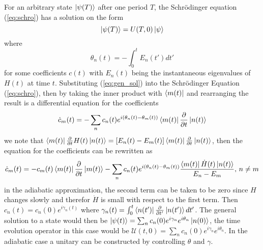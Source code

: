 For an arbitrary state $\ket{\psi(T)}$ after one period $T$, the Schrödinger equation (\ref{eq:schro}) has a solution on the form 
\begin{equation}
\label{eq:gen_sol}
\ket{\psi(T)} = U(T,0)\ket{\psi}
\end{equation}
where 
\begin{equation}
\theta_n(t) = -\int_0^t E_n(t')dt'
\end{equation}
for some coefficients $c(t)$ with $E_n(t)$ being the instantaneous eigenvalues of $H(t)$ at time $t$. Substituting (\ref{eq:gen_sol}) into the Schrödinger Equation (\ref{eq:schro}), then by taking the inner product with $\bra{m(t)}$ and rearranging the result is a differential equation for the coefficients 
\begin{equation}
\dot{c}_m(t) = -\sum_{n}c_n(t) e^{i(\theta_n(t) - \theta_m(t))}\bra{m(t)}\pdv{}{t}\ket{n(t)}
\end{equation}
we note that $\bra{m(t)}\pdv{}{t}H(t)\ket{n(t)} = [E_n(t) - E_m(t)]\bra{m(t)}\pdv{}{t}\ket{n(t)}$,
then the equation for the coefficients can be rewritten as
\begin{equation}
\label{eq:non-ad}
\dot{c}_m(t) = -c_m(t) \bra{m(t)}\pdv{}{t}\ket{m(t)} - \sum_{n}c_n(t)e^{i(\theta_n(t) - \theta_m(t))}\frac{\bra{m(t)}\dot{H}(t)\ket{n(t)} }{E_n - E_m},\, n \neq m
\end{equation} 
in the adiabatic approximation\cite{adiabatensatz}, the second term can be taken to be zero since $H$ changes slowly and therefor $\dot{H}$ is small with respect to the first term. 
Then $c_n(t) = c_n(0)e^{i\gamma_n(t)}$ where $\gamma_n(t) = \int_0^t \bra{n(t')}\pdv{}{t'}\ket{n(t')} dt'$.
The general solution to a state would then be $\ket{\psi(t)} = \sum_{n}c_n(0)e^{i\gamma_n}e^{i\theta_n}\ket{n(0)}$, the time evolution operator in this case would be $\mathcal{U}(t,0) = \sum_{n}c_n(0)e^{i\gamma_n}e^{i\theta_n}$. In the adiabatic case a unitary can be constructed by controlling $\theta$ and $\gamma$.


